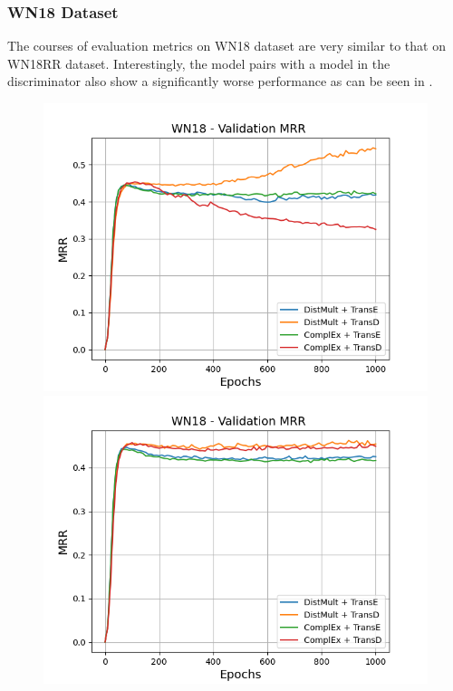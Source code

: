\subsubsection{WN18 Dataset} 
\label{subsubsec:methods_wn18}
%
The courses of evaluation metrics on \textsc{WN18} dataset are very similar to that on \textsc{WN18RR} dataset.
Interestingly, the model pairs with a \transd model in the discriminator also show a significantly worse performance as can be seen in .
\begin{figure}
    \centering
    \begin{minipage}{.5\textwidth}
      \centering
      \includegraphics[width=0.9\linewidth]{figures/results/gan_train/not_pretrained/uncertainty/max/entropy/wn18/1k_epochs/uncertainty_wn18_mrrs.png}
    \end{minipage}%
    \begin{minipage}{.5\textwidth}
      \centering
      \includegraphics[width=0.9\linewidth]{figures/results/gan_train/not_pretrained/uncertainty/max_distribution/entropy/wn18/1k_epochs/uncertainty_wn18_mrrs.png}

\end{minipage}
\end{figure}
